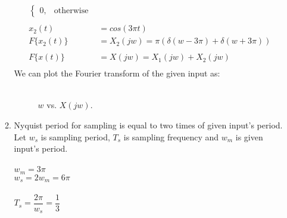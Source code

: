 \documentclass[10pt,a4paper, margin=1in]{article}
\begin{document}
\begin{enumerate}
\begin{enumerate}
\begin{align*}
\begin{cases}
                               0, & \text{otherwise}
                             \end{cases} \\
    \\
    x_2(t) &= cos(3\pi t) \\
    F\{x_2(t)\} &= X_2(jw) = \pi (\delta (w - 3\pi) + \delta (w + 3\pi)) \\
    \\
    F\{x(t)\} &= X(jw)= X_1(jw) + X_2(jw) \\
    \end{align*}
    We can plot the Fourier transform of the given input as: \\
    \\
\begin{figure}[h!]
    \centering
        \caption{$w$ vs. $X(jw)$.}
    \end{figure}

    
    \item Nyquist period for sampling is equal to two times of given input's period. Let $w_s$ is sampling period, $T_s$ is sampling frequency and $w_m$ is given input's period.\\
    \\
    $w_m = 3\pi$ \\
    $w_s = 2w_m = 6\pi$ \\
    \\
    $T_s = \dfrac{2\pi}{w_s} = \dfrac{1}{3}$ \\
    

\end{enumerate}
\end{enumerate}
\end{document}
